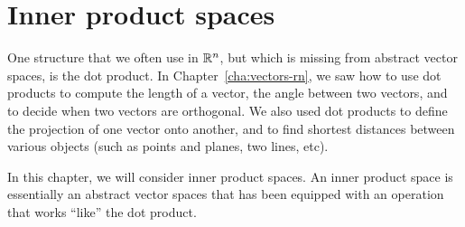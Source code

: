 \chapter{Inner product spaces}

One structure that we often use in $\mathbb{R}^n$, but which is missing from
abstract vector spaces, is the dot product. In
Chapter~\ref{cha:vectors-rn}, we saw how to use dot products to
compute the length of a vector, the angle between two vectors, and to
decide when two vectors are orthogonal. We also used dot products to
define the projection of one vector onto another, and to find shortest
distances between various objects (such as points and planes, two
lines, etc).

In this chapter, we will consider inner product spaces. An inner
product space is essentially an abstract vector spaces that has been
equipped with an operation that works ``like'' the dot product.
